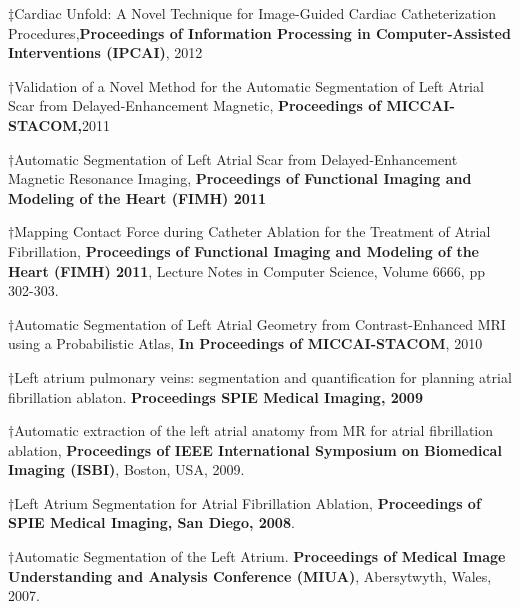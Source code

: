\documentclass[letterpaper]{twentysecondcv} %
\begin{document}
\begin{etaremune}
	\item $\ddagger$Cardiac Unfold: A Novel Technique for Image-Guided Cardiac Catheterization Procedures,\textbf{Proceedings of Information Processing in Computer-Assisted Interventions (IPCAI)}, 2012
	\item $\dagger$Validation of a Novel Method for the Automatic Segmentation of Left Atrial Scar from Delayed-Enhancement Magnetic, \textbf{Proceedings of MICCAI-STACOM,}2011
	\item $\dagger$Automatic Segmentation of Left Atrial Scar from Delayed-Enhancement Magnetic Resonance Imaging, \textbf{Proceedings of Functional Imaging and Modeling of the Heart (FIMH) 2011}
	\item $\dagger$Mapping Contact Force during Catheter Ablation for the Treatment of Atrial Fibrillation, \textbf{Proceedings of Functional Imaging and Modeling of the Heart (FIMH) 2011}, Lecture Notes in Computer Science,  Volume 6666, pp 302-303. 
	\item $\dagger$Automatic Segmentation of Left Atrial Geometry from Contrast-Enhanced MRI using a Probabilistic Atlas, \textbf{In Proceedings of MICCAI-STACOM}, 2010
	\item $\dagger$Left atrium pulmonary veins: segmentation and quantification for planning atrial fibrillation ablaton. \textbf{Proceedings SPIE Medical Imaging, 2009} 
	\item $\dagger$Automatic extraction of the left atrial anatomy from MR for atrial fibrillation ablation, \textbf{Proceedings of IEEE International Symposium on Biomedical Imaging (ISBI)}, Boston, USA, 2009. 
	\item $\dagger$Left Atrium Segmentation for Atrial Fibrillation Ablation, \textbf{Proceedings of SPIE Medical Imaging, San Diego, 2008}. 
	\item $\dagger$Automatic Segmentation of the Left Atrium. \textbf{Proceedings of Medical Image Understanding and Analysis Conference (MIUA)}, Abersytwyth, Wales, 2007. 
\end{etaremune}
\end{document}
